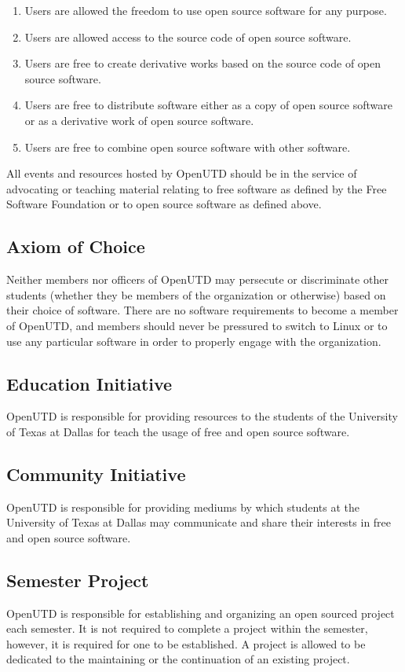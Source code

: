 \documentclass{constitution}
\begin{document}
\begin{enumerate}
\item Users are allowed the freedom to use open source software for any purpose.
\item Users are allowed access to the source code of open source software.
\item Users are free to create derivative works based on the source code of open
  source software.
\item Users are free to distribute software either as a copy of open source
  software or as a derivative work of open source software.
\item Users are free to combine open source software with other software.
\end{enumerate}

\noindent
All events and resources hosted by OpenUTD should be in the service of
advocating or teaching material relating to free software as defined by the Free
Software Foundation or to open source software as defined above.

\subsection{Axiom of Choice \color{Gold}}

Neither members nor officers of OpenUTD may persecute or discriminate other
students (whether they be members of the organization or otherwise) based on
their choice of software. There are no software requirements to become a member
of OpenUTD, and members should never be pressured to switch to Linux or to use
any particular software in order to properly engage with the organization.

\subsection{Education Initiative}

OpenUTD is responsible for providing resources to the students of the University
of Texas at Dallas for teach the usage of free and open source software.

\subsection{Community Initiative}

OpenUTD is responsible for providing mediums by which students at the University
of Texas at Dallas may communicate and share their interests in free and open
source software.

\subsection{Semester Project}

OpenUTD is responsible for establishing and organizing an open sourced project
each semester. It is not required to complete a project within the semester,
however, it is required for one to be established. A project is allowed to be
dedicated to the maintaining or the continuation of an existing project.
\end{document}
